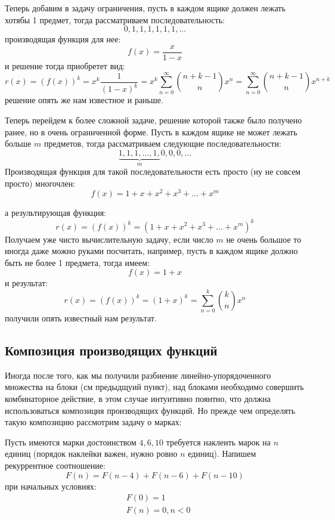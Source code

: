 Теперь добавим в задачу ограничения, пусть в каждом ящике должен лежать хотябы 1 предмет, тогда рассматриваем последовательность:
\[
	0, 1, 1, 1, 1, 1, 1, ...
\]
производящая функция для нее:
\[
	f\left(x\right) = \frac{x}{1-x}
\]
и решение тогда приобретет вид:
\[
	r\left(x\right) = \left(f\left(x\right)\right)^k = x^k \frac{1}{\left(1-x\right)^k} = x^k \sum_{n=0}^{\infty} \binom{n+k-1}{n} x^n = \sum_{n=0}^{\infty} \binom{n+k-1}{n} x^{n+k}
\]
решение опять же нам известное и раньше.

Теперь перейдем к более сложной задаче, решение которой также было получено ранее, но в очень ограниченной форме. Пусть в каждом ящике не может лежать больше $m$ предметов, тогда рассматриваем следующие последовательности:
\[
	\underbrace{1, 1, 1, ..., 1,}_{m} 0, 0, 0, ...
\]
Производящая функция для такой последовательности есть просто (ну не совсем просто) многочлен:
\[
	f\left(x\right) = 1 + x + x^2 + x^3 + ... + x^m
\]

а результирующая функция:
\[
	r\left(x\right) = \left(f\left(x\right)\right)^k = \left(1 + x + x^2 + x^3 + ... + x^m\right)^k
\]
Получаем уже чисто вычислительную задачу, если число $m$ не очень большое то иногда даже можно руками посчитать, например, пусть в каждом ящике должно быть не более 1 предмета, тогда имеем:
\[
	f\left(x\right) = 1 + x
\]
и результат:
\[
	r\left(x\right) = \left(f\left(x\right)\right)^k = \left(1+x\right)^k = \sum_{n=0}^{k} \binom{k}{n} x^n
\]
получили опять известный нам результат.

\subsection{Композиция производящих функций}

Иногда после того, как мы получили разбиение линейно-упорядоченного множества на блоки (см предыдщуий пункт), над блоками необходимо совершить комбинаторное действие, в этом случае интуитивно поянтно, что должна использоваться композиция производящих функций. Но прежде чем определять такую композицию рассмотрим задачу о марках:

Пусть имеются марки достоинством $4, 6, 10$ требуется наклеить марок на $n$ единиц (порядок наклейки важен, нужно ровно $n$ единиц). Напишем рекуррентное соотношение:
\[
	F\left(n\right) = F\left(n-4\right) + F\left(n-6\right) + F\left(n-10\right)
\]
при начальных условиях:
\[
	\begin{split}
		& F\left(0\right) = 1 \\
		& F\left(n\right) = 0, n < 0
	\end{split}
\]

